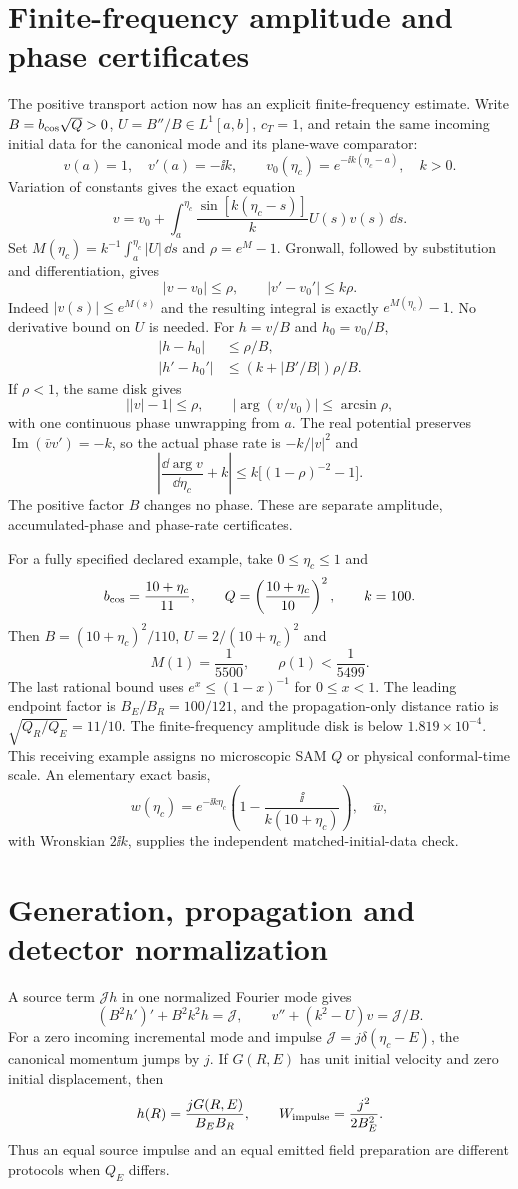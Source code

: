 \section{Finite-frequency amplitude and phase certificates}
The positive transport action now has an explicit finite-frequency estimate.
Write $B=b_{\rm cos}\sqrt Q>0$, $U=B''/B\in L^1[a,b]$, $c_T=1$, and retain the same incoming initial data for the canonical mode and its plane-wave comparator:
\[
 v(a)=1,\quad v'(a)=-\ii k,\qquad
 v_0(\eta_c)=e^{-\ii k(\eta_c-a)},\quad k>0.
\]
Variation of constants gives the exact equation
\[
 v=v_0+\int_a^{\eta_c}\frac{\sin[k(\eta_c-s)]}{k}U(s)v(s)\,\dd s.
\]
Set $M(\eta_c)=k^{-1}\int_a^{\eta_c}|U|\,\dd s$ and $\rho=e^M-1$. Gronwall, followed by substitution and differentiation, gives
\[
 |v-v_0|\le\rho,\qquad |v'-v_0'|\le k\rho.
\]
Indeed $|v(s)|\le e^{M(s)}$ and the resulting integral is exactly $e^{M(\eta_c)}-1$. No derivative bound on $U$ is needed. For $h=v/B$ and $h_0=v_0/B$,
\[
\begin{split}
 |h-h_0|&\le\rho/B,\\
 |h'-h_0'|&\le(k+|B'/B|)\rho/B.
\end{split}
\]
If $\rho<1$, the same disk gives
\[
 \big||v|-1\big|\le\rho,\qquad
 |\arg(v/v_0)|\le\arcsin\rho,
\]
with one continuous phase unwrapping from $a$. The real potential preserves $\operatorname{Im}(\bar v v')=-k$, so the actual phase rate is $-k/|v|^2$ and
\[
 \left|\frac{\dd\arg v}{\dd\eta_c}+k\right|
 \le k\big[(1-\rho)^{-2}-1\big].
\]
The positive factor $B$ changes no phase. These are separate amplitude, accumulated-phase and phase-rate certificates.

For a fully specified declared example, take $0\le\eta_c\le1$ and
\[
 b_{\rm cos}=\frac{10+\eta_c}{11},\qquad
 Q=\left(\frac{10+\eta_c}{10}\right)^2,\qquad k=100.
\]
Then $B=(10+\eta_c)^2/110$, $U=2/(10+\eta_c)^2$ and
\[
 M(1)=\frac1{5500},\qquad \rho(1)<\frac1{5499}.
\]
The last rational bound uses $e^x\le(1-x)^{-1}$ for $0\le x<1$. The leading endpoint factor is $B_E/B_R=100/121$, and the propagation-only distance ratio is $\sqrt{Q_R/Q_E}=11/10$. The finite-frequency amplitude disk is below $1.819\times10^{-4}$. This receiving example assigns no microscopic SAM $Q$ or physical conformal-time scale. An elementary exact basis,
\[
 w(\eta_c)=e^{-\ii k\eta_c}
 \left(1-\frac{\ii}{k(10+\eta_c)}\right),\quad\bar w,
\]
with Wronskian $2\ii k$, supplies the independent matched-initial-data check.

\section{Generation, propagation and detector normalization}
A source term $\mathcal J h$ in one normalized Fourier mode gives
\[
 (B^2h')'+B^2k^2h=\mathcal J,\qquad
 v''+(k^2-U)v=\mathcal J/B.
\]
For a zero incoming incremental mode and impulse $\mathcal J=j\delta(\eta_c-E)$, the canonical momentum jumps by $j$. If $G(R,E)$ has unit initial velocity and zero initial displacement, then
\[
 h(R)=\frac{jG(R,E)}{B_EB_R},\qquad
 W_{\rm impulse}=\frac{j^2}{2B_E^2}.
\]
Thus an equal source impulse and an equal emitted field preparation are different protocols when $Q_E$ differs.

